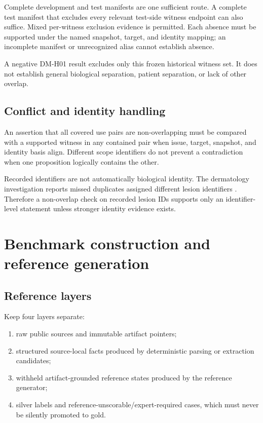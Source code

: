 \documentclass[11pt,a4paper]{article}
\begin{document}
Complete development and test manifests are one sufficient route. A complete test manifest that excludes every relevant test-side witness endpoint can also suffice. Mixed per-witness exclusion evidence is permitted. Each absence must be supported under the named snapshot, target, and identity mapping; an incomplete manifest or unrecognized alias cannot establish absence.

A negative DM-H01 result excludes only this frozen historical witness set. It does not establish general biological separation, patient separation, or lack of other overlap.

\subsection{Conflict and identity handling}
An assertion that all covered use pairs are non-overlapping must be compared with a supported witness in any contained pair when issue, target, snapshot, and identity basis align. Different scope identifiers do not prevent a contradiction when one proposition logically contains the other.

Recorded identifiers are not automatically biological identity. The dermatology investigation reports missed duplicates assigned different lesion identifiers \cite{abhishek2025}. Therefore a non-overlap check on recorded lesion IDs supports only an identifier-level statement unless stronger identity evidence exists.

\section{Benchmark construction and reference generation}
\label{sec:benchmark}
\subsection{Reference layers}
Keep four layers separate:
\begin{enumerate}
\item raw public sources and immutable artifact pointers;
\item structured source-local facts produced by deterministic parsing or extraction candidates;
\item withheld artifact-grounded reference states produced by the reference generator;
\item silver labels and reference-unscorable/expert-required cases, which must never be silently promoted to gold.
\end{enumerate}
\end{document}

